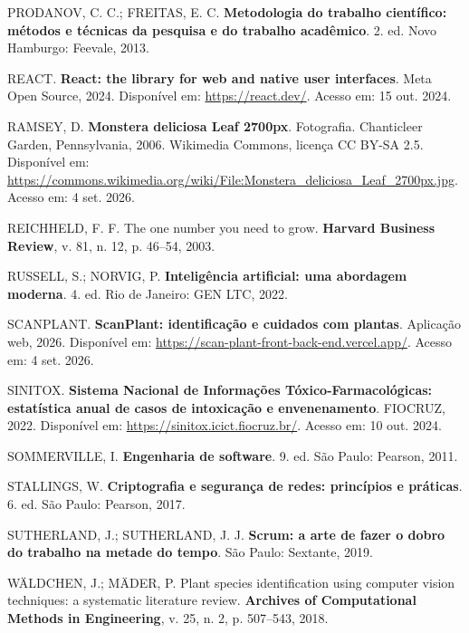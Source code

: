 \documentclass[12pt,a4paper]{article}
\begin{document}
\vspace{0.2cm}
\noindent PRODANOV, C. C.; FREITAS, E. C. \textbf{Metodologia do trabalho científico: métodos e técnicas da pesquisa e do trabalho acadêmico}. 2. ed. Novo Hamburgo: Feevale, 2013.

\vspace{0.2cm}
\noindent REACT. \textbf{React: the library for web and native user interfaces}. Meta Open Source, 2024. Disponível em: \url{https://react.dev/}. Acesso em: 15 out. 2024.

\vspace{0.2cm}
\noindent RAMSEY, D. \textbf{Monstera deliciosa Leaf 2700px}. Fotografia. Chanticleer Garden, Pennsylvania, 2006. Wikimedia Commons, licença CC BY-SA 2.5. Disponível em: \url{https://commons.wikimedia.org/wiki/File:Monstera_deliciosa_Leaf_2700px.jpg}. Acesso em: 4 set. 2026.

\vspace{0.2cm}
\noindent REICHHELD, F. F. The one number you need to grow. \textbf{Harvard Business Review}, v. 81, n. 12, p. 46--54, 2003.

\vspace{0.2cm}
\noindent RUSSELL, S.; NORVIG, P. \textbf{Inteligência artificial: uma abordagem moderna}. 4. ed. Rio de Janeiro: GEN LTC, 2022.

\vspace{0.2cm}
\noindent SCANPLANT. \textbf{ScanPlant: identificação e cuidados com plantas}. Aplicação web, 2026. Disponível em: \url{https://scan-plant-front-back-end.vercel.app/}. Acesso em: 4 set. 2026.

\vspace{0.2cm}
\noindent SINITOX. \textbf{Sistema Nacional de Informações Tóxico-Farmacológicas: estatística anual de casos de intoxicação e envenenamento}. FIOCRUZ, 2022. Disponível em: \url{https://sinitox.icict.fiocruz.br/}. Acesso em: 10 out. 2024.

\vspace{0.2cm}
\noindent SOMMERVILLE, I. \textbf{Engenharia de software}. 9. ed. São Paulo: Pearson, 2011.

\vspace{0.2cm}
\noindent STALLINGS, W. \textbf{Criptografia e segurança de redes: princípios e práticas}. 6. ed. São Paulo: Pearson, 2017.

\vspace{0.2cm}
\noindent SUTHERLAND, J.; SUTHERLAND, J. J. \textbf{Scrum: a arte de fazer o dobro do trabalho na metade do tempo}. São Paulo: Sextante, 2019.

\vspace{0.2cm}
\noindent WÄLDCHEN, J.; MÄDER, P. Plant species identification using computer vision techniques: a systematic literature review. \textbf{Archives of Computational Methods in Engineering}, v. 25, n. 2, p. 507--543, 2018.
\end{document}
